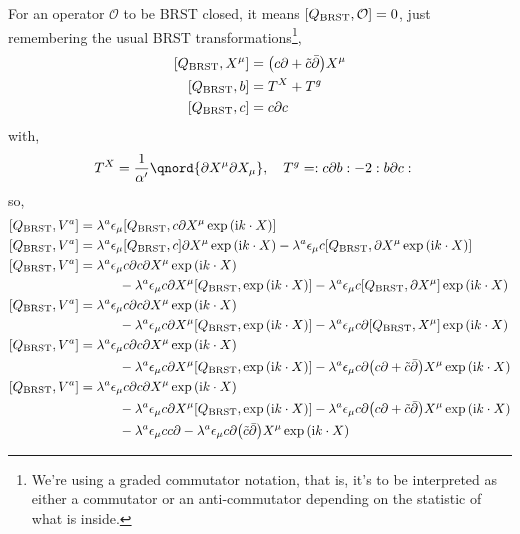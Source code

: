 \problem{}
\probitem{}

For an operator $\mathcal O$ to be BRST closed, it means $\comm{Q_{\textnormal{BRST}}}{\mathcal O}=0$, just remembering the usual BRST transformations\footnote{We're using a graded commutator notation, that is, it's to be interpreted as 
either a commutator or an anti-commutator depending on the statistic of what is inside.},
\begin{align*}
    \comm{Q_{\textnormal{BRST}}}{X^\mu}&=\qty(c\partial+\tilde c\bar\partial)X^\mu\\
    \comm{Q_{\textnormal{BRST}}}{b}&=T^X+T^g\\
    \comm{Q_{\textnormal{BRST}}}{c}&=c\partial c
\end{align*}
with,
\begin{align*}
    T^X&=\frac{1}{\alpha'}\qnord{\partial X^\mu\partial X_\mu},\ \ \ T^g=\cnord{c\partial b}-2\cnord{b\partial c}
\end{align*}
so,
\begin{align*}
    \comm{Q_{\textnormal{BRST}}}{V^a}&=\lambda^a\epsilon_\mu\comm{Q_{\textnormal{BRST}}}{c\partial X^\mu\exp\qty(\im k\cdot X)}\\
    \comm{Q_{\textnormal{BRST}}}{V^a}&=\lambda^a\epsilon_\mu\comm{Q_{\textnormal{BRST}}}{c}\partial X^\mu\exp\qty(\im k\cdot X)-\lambda^a\epsilon_\mu c\comm{Q_{\textnormal{BRST}}}{\partial X^\mu\exp\qty(\im k\cdot X)}\\
    \comm{Q_{\textnormal{BRST}}}{V^a}&=\lambda^a\epsilon_\mu c\partial c\partial X^\mu\exp\qty(\im k\cdot X)\\
    &\quad\quad\quad-\lambda^a\epsilon_\mu c\partial X^\mu\comm{Q_{\textnormal{BRST}}}{\exp\qty(\im k\cdot X)}-\lambda^a\epsilon_\mu c\comm{Q_{\textnormal{BRST}}}{\partial X^\mu}\exp\qty(\im k\cdot X)\\
    \comm{Q_{\textnormal{BRST}}}{V^a}&=\lambda^a\epsilon_\mu c\partial c\partial X^\mu\exp\qty(\im k\cdot X)\\
    &\quad\quad\quad-\lambda^a\epsilon_\mu c\partial X^\mu\comm{Q_{\textnormal{BRST}}}{\exp\qty(\im k\cdot X)}-\lambda^a\epsilon_\mu c\partial\comm{Q_{\textnormal{BRST}}}{ X^\mu}\exp\qty(\im k\cdot X)\\
    \comm{Q_{\textnormal{BRST}}}{V^a}&=\lambda^a\epsilon_\mu c\partial c\partial X^\mu\exp\qty(\im k\cdot X)\\
    &\quad\quad\quad-\lambda^a\epsilon_\mu c\partial X^\mu\comm{Q_{\textnormal{BRST}}}{\exp\qty(\im k\cdot X)}-\lambda^a\epsilon_\mu c\partial\qty(c\partial+\tilde c\bar\partial)X^\mu\exp\qty(\im k\cdot X)\\
    \comm{Q_{\textnormal{BRST}}}{V^a}&=\lambda^a\epsilon_\mu c\partial c\partial X^\mu\exp\qty(\im k\cdot X)\\
    &\quad\quad\quad-\lambda^a\epsilon_\mu c\partial X^\mu\comm{Q_{\textnormal{BRST}}}{\exp\qty(\im k\cdot X)}-\lambda^a\epsilon_\mu c\partial\qty(c\partial+\tilde c\bar\partial)X^\mu\exp\qty(\im k\cdot X)\\
    &\quad\quad\quad-\lambda^a\epsilon_\mu cc\partial-\lambda^a\epsilon_\mu c\partial\qty(\tilde c\bar\partial)X^\mu\exp\qty(\im k\cdot X)
\end{align*}
\probitem{}
\probitem{}
\probitem{}